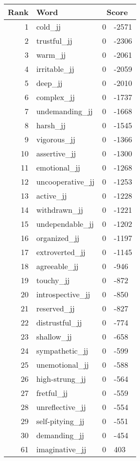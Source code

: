 \begin{longtable}[!htbp]{| rlr@{.}l |}
    \hline
    \textbf{Rank} & \textbf{Word} & \multicolumn{2}{c|}{\textbf{Score}} \\
    \hline
    \endhead
    1 & cold\_jj & 0 & -2571 \\
    2 & trustful\_jj & 0 & -2306 \\
    3 & warm\_jj & 0 & -2061 \\
    4 & irritable\_jj & 0 & -2059 \\
    5 & deep\_jj & 0 & -2010 \\
    6 & complex\_jj & 0 & -1737 \\
    7 & undemanding\_jj & 0 & -1668 \\
    8 & harsh\_jj & 0 & -1545 \\
    9 & vigorous\_jj & 0 & -1366 \\
    10 & assertive\_jj & 0 & -1300 \\
    11 & emotional\_jj & 0 & -1268 \\
    12 & uncooperative\_jj & 0 & -1253 \\
    13 & active\_jj & 0 & -1228 \\
    14 & withdrawn\_jj & 0 & -1221 \\
    15 & undependable\_jj & 0 & -1202 \\
    16 & organized\_jj & 0 & -1197 \\
    17 & extroverted\_jj & 0 & -1145 \\
    18 & agreeable\_jj & 0 & -946 \\
    19 & touchy\_jj & 0 & -872 \\
    20 & introspective\_jj & 0 & -850 \\
    21 & reserved\_jj & 0 & -827 \\
    22 & distrustful\_jj & 0 & -774 \\
    23 & shallow\_jj & 0 & -658 \\
    24 & sympathetic\_jj & 0 & -599 \\
    25 & unemotional\_jj & 0 & -588 \\
    26 & high-strung\_jj & 0 & -564 \\
    27 & fretful\_jj & 0 & -559 \\
    28 & unreflective\_jj & 0 & -554 \\
    29 & self-pitying\_jj & 0 & -551 \\
    30 & demanding\_jj & 0 & -454 \\
    61 & imaginative\_jj & 0 & 403 \\

\end{longtable}

